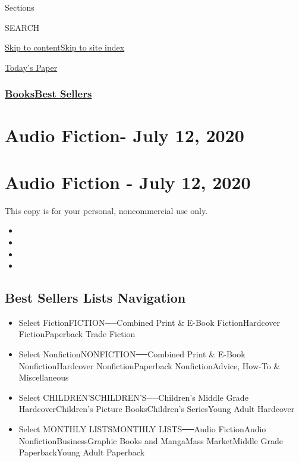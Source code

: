 Sections

SEARCH

\protect\hyperlink{site-content}{Skip to
content}\protect\hyperlink{site-index}{Skip to site index}

\href{https://myaccount.nytimes3xbfgragh.onion/auth/login?response_type=cookie\&client_id=vi}{}

\href{https://www.nytimes3xbfgragh.onion/section/todayspaper}{Today's
Paper}

\hypertarget{booksbest-sellers}{%
\subsubsection{\texorpdfstring{\href{/section/books/}{Books}\textbar{}\href{/books/best-sellers/}{Best
Sellers}}{Books\textbar{}Best Sellers}}\label{booksbest-sellers}}

\hypertarget{audio-fiction--july-12-2020}{%
\section{Audio Fiction- July 12,
2020}\label{audio-fiction--july-12-2020}}

\hypertarget{audio-fiction---july-12-2020}{%
\section{Audio Fiction - July 12,
2020}\label{audio-fiction---july-12-2020}}

This copy is for your personal, noncommercial use only.

\begin{itemize}
\item
\item
\item
\item
\end{itemize}

\hypertarget{best-sellers-lists-navigation}{%
\subsection{Best Sellers Lists
Navigation}\label{best-sellers-lists-navigation}}

\begin{itemize}
\tightlist
\item
  Select FictionFICTION──Combined Print \& E-Book FictionHardcover
  FictionPaperback Trade Fiction
\item
  Select NonfictionNONFICTION──Combined Print \& E-Book
  NonfictionHardcover NonfictionPaperback NonfictionAdvice, How-To \&
  Miscellaneous
\item
  Select CHILDREN'SCHILDREN'S──Children's Middle Grade
  HardcoverChildren's Picture BooksChildren's SeriesYoung Adult
  Hardcover
\item
  Select MONTHLY LISTSMONTHLY LISTS──Audio FictionAudio
  NonfictionBusinessGraphic Books and MangaMass MarketMiddle Grade
  PaperbackYoung Adult Paperback
\end{itemize}

